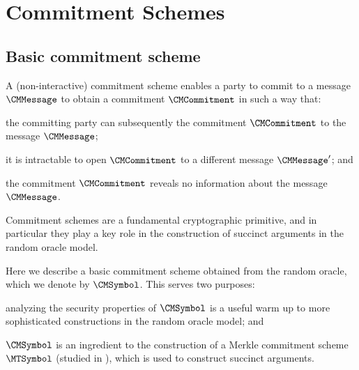 \part{Commitment Schemes}
\label{part:commitment-schemes}


\chapter{Basic commitment scheme}
\label{chapter:basic-commitment}

A (non-interactive) commitment scheme enables a party to commit to a message $\CMMessage$ to obtain a commitment $\CMCommitment$ in such a way that:
\begin{inparaenum}[(a)]
  \item the committing party can subsequently  the commitment $\CMCommitment$ to the message $\CMMessage$;
  \item it is intractable to open $\CMCommitment$ to a different message $\CMMessage'$; and
  \item the commitment $\CMCommitment$ reveals no information about the message $\CMMessage$.
\end{inparaenum}
Commitment schemes are a fundamental cryptographic primitive, and in particular they play a key role in the construction of succinct arguments in the random oracle model.

Here we describe a basic commitment scheme obtained from the random oracle, which we denote by $\CMSymbol$. This serves two purposes:
\begin{inparaenum}[(1)]
  \item analyzing the security properties of $\CMSymbol$ is a useful warm up to more sophisticated constructions in the random oracle model; and
  \item $\CMSymbol$ is an ingredient to the construction of a Merkle commitment scheme $\MTSymbol$ (studied in ), which is used to construct succinct arguments.
\end{inparaenum}

